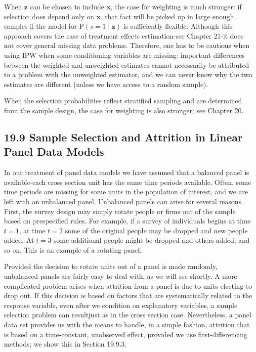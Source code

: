 \documentclass[10pt]{article}
\begin{document}
When $\mathbf{z}$ can be chosen to include $\mathbf{x}$, the case for weighting is much stronger: if selection does depend only on $\mathbf{x}$, that fact will be picked up in large enough samples if the model for $\mathrm{P}(s=1 \mid \mathbf{z})$ is sufficiently flexible. Although this approach covers the case of treatment effects estimation-see Chapter 21-it does not cover general missing data problems. Therefore, one has to be cautious when using IPW when some conditioning variables are missing: important differences between the weighted and unweighted estimates cannot necessarily be attributed to a problem with the unweighted estimator, and we can never know why the two estimates are different (unless we have access to a random sample).

When the selection probabilities reflect stratified sampling and are determined from the sample design, the case for weighting is also stronger; see Chapter 20.

\subsection*{19.9 Sample Selection and Attrition in Linear Panel Data Models}
In our treatment of panel data models we have assumed that a balanced panel is available-each cross section unit has the same time periods available. Often, some\\
time periods are missing for some units in the population of interest, and we are left with an unbalanced panel. Unbalanced panels can arise for several reasons. First, the survey design may simply rotate people or firms out of the sample based on prespecified rules. For example, if a survey of individuals begins at time $t=1$, at time $t=2$ some of the original people may be dropped and new people added. At $t=3$ some additional people might be dropped and others added; and so on. This is an example of a rotating panel.

Provided the decision to rotate units out of a panel is made randomly, unbalanced panels are fairly easy to deal with, as we will see shortly. A more complicated problem arises when attrition from a panel is due to units electing to drop out. If this decision is based on factors that are systematically related to the response variable, even after we condition on explanatory variables, a sample selection problem can resultjust as in the cross section case. Nevertheless, a panel data set provides us with the means to handle, in a simple fashion, attrition that is based on a time-constant, unobserved effect, provided we use first-differencing methods; we show this in Section 19.9.3.
\end{document}
